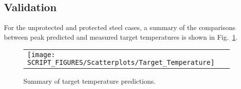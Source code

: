 \clearpage


\subsection*{Validation}

For the unprotected and protected steel cases, a summary of the comparisons between peak predicted and measured target temperatures is shown in Fig.~\ref{Surface_Temperature_Steel_Summary}.

\begin{figure}[!ht]
\begin{center}
\begin{tabular}{l}
\texttt{[image: SCRIPT\_FIGURES/Scatterplots/Target\_Temperature]}
\end{tabular}
\end{center}
\caption[Summary of target temperature predictions]
{Summary of target temperature predictions.}
\label{Surface_Temperature_Steel_Summary}
\end{figure}

